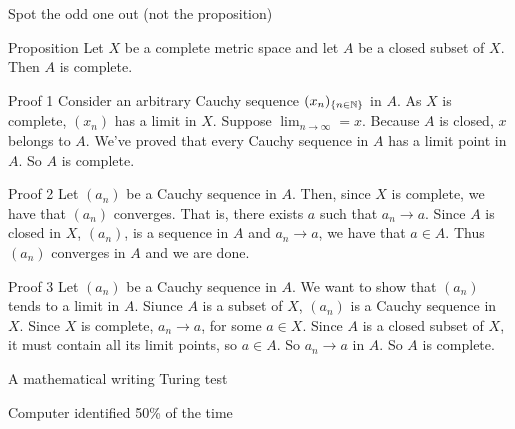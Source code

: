 \small

%

\begin{frame}
  \begin{block}{}
    \titlepage
  \end{block}
\end{frame}

\begin{frame}{Spot the odd one out (not the proposition)}
  \begin{block}{Proposition}
Let $X$ be a complete metric space and let $A$ be a closed subset of $X$. Then $A$ is complete.
  \end{block}
  \begin{block}{Proof 1}
Consider an arbitrary Cauchy sequence $(x_n)_{\{n\in\mathbb{N}\}}$ in $A$. As $X$ is complete, $(x_n)$ has a limit in $X$. Suppose $\lim_{n\to\infty} = x$. Because $A$ is closed, $x$ belongs to $A$. We've proved that every Cauchy sequence in $A$ has a limit point in $A$. So $A$ is complete.
  \end{block}
  \begin{block}{Proof 2}
Let $(a_n)$ be a Cauchy sequence in $A$. Then, since $X$ is complete, we have that $(a_n)$ converges. That is, there exists $a$ such that $a_n \to a$. Since $A$ is closed in $X$, $(a_n)$, is a sequence in $A$ and $a_n \to a$, we have that $a \in A$. Thus $(a_n)$ converges in $A$ and we are done.
  \end{block}
  \begin{block}{Proof 3}
Let $(a_n)$ be a Cauchy sequence in $A$. We want to show that $(a_n)$ tends to a limit in $A$. Siunce $A$ is a subset of $X$, $(a_n)$ is a Cauchy sequence in $X$. Since $X$ is complete, $a_n \to a$, for some $a \in X$. Since $A$ is a closed subset of $X$, it must contain all its limit points, so $a \in A$. So $a_n \to a$ in $A$. So $A$ is complete.
  \end{block}
\end{frame}

\begin{frame}{A mathematical writing Turing test}
  \begin{block}{Computer identified 50\% of the time}
    \begin{center}
      
    \end{center}
  \end{block}
\end{frame}

